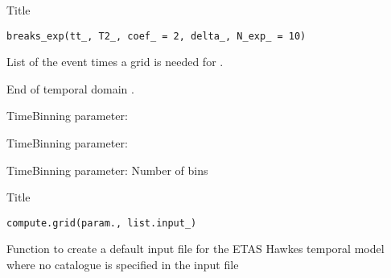 \documentclass[letterpaper]{book}
\begin{document}
%
\begin{Description}\relax
Title
\end{Description}
%
\begin{Usage}
\begin{verbatim}
breaks_exp(tt_, T2_, coef_ = 2, delta_, N_exp_ = 10)
\end{verbatim}
\end{Usage}
%
\begin{Arguments}
\begin{ldescription}
\item[\code{tt\_}] List of the event times a grid is needed for .

\item[\code{T2\_}] End of temporal domain .

\item[\code{coef\_}] TimeBinning parameter:

\item[\code{delta\_}] TimeBinning parameter:

\item[\code{N\_exp\_}] TimeBinning parameter: Number of bins
\end{ldescription}
\end{Arguments}
%
\begin{Description}\relax
Title
\end{Description}
%
\begin{Usage}
\begin{verbatim}
compute.grid(param., list.input_)
\end{verbatim}
\end{Usage}
%
\begin{Arguments}
\begin{ldescription}
\item[\code{list.input\_}] 
\end{ldescription}
\end{Arguments}
%
\begin{Description}\relax
Function to create a default input file for the ETAS Hawkes temporal model where no catalogue is specified in the input file
\end{Description}
\end{document}
